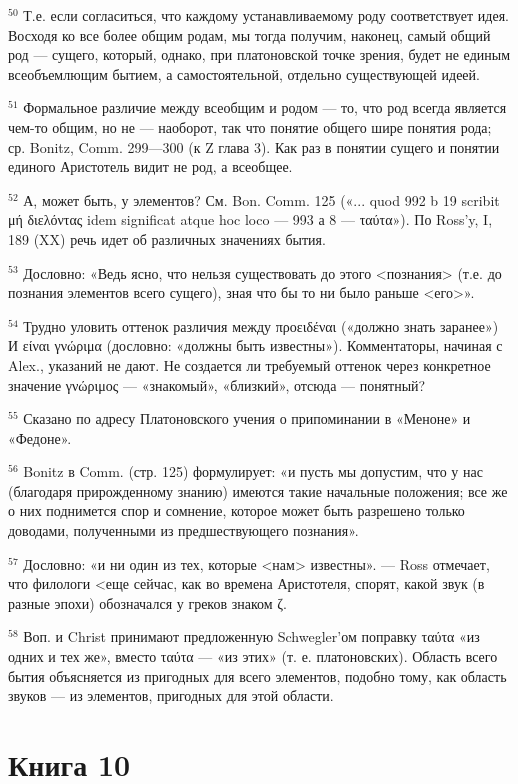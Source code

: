 \documentclass[oneside, 17pt, dvipsnames]{extbook}
\begin{document}
$^{50}$ Т.е. если согласиться, что каждому устанавливаемому роду соответствует идея. Восходя ко все более общим родам, мы тогда получим, наконец, самый общий род — сущего, который, однако, при платоновской точке зрения, будет не единым всеобъемлющим бытием, а самостоятельной, отдельно существующей идеей.

$^{51}$ Формальное различие между всеобщим и родом — то, что род всегда является чем-то общим, но не — наоборот, так что понятие общего шире понятия рода; ср. Bonitz, Comm. 299—300 (к Ζ глава 3). Как раз в понятии сущего и понятии единого Аристотель видит не род, а всеобщее.

$^{52}$ А, может быть, у элементов? См. Bon. Comm. 125 («... quod 992 b 19 scribit μή διελόντας idem significat atque hoc loco — 993 а 8 — ταύτα»). По Ross'y, I, 189 (XX) речь идет об различных значениях бытия.

$^{53}$ Дословно: «Ведь ясно, что нельзя существовать до этого <познания> (т.е. до познания элементов всего сущего), зная что бы то ни было раньше <его>».

$^{54}$ Трудно уловить оттенок различия между προειδέναι («должно знать заранее») И είναι γνώριμα (дословно: «должны быть известны»). Комментаторы, начиная с Alex., указаний не дают. Не создается ли требуемый оттенок через конкретное значение γνώριμος — «знакомый», «близкий», отсюда — понятный?

$^{55}$ Сказано по адресу Платоновского учения о припоминании в «Меноне» и «Федоне».

$^{56}$ Bonitz в Comm. (стр. 125) формулирует: «и пусть мы допустим, что у нас (благодаря прирожденному знанию) имеются такие начальные положения; все же о них поднимется спор и сомнение, которое может быть разрешено только доводами, полученными из предшествующего познания».

$^{57}$ Дословно: «и ни один из тех, которые <нам> известны». — Ross отмечает, что филологи <еще сейчас, как во времена Аристотеля, спорят, какой звук (в разные эпохи) обозначался у греков знаком ζ.

$^{58}$ Воп. и Christ принимают предложенную Schwegler'ом поправку ταύτα «из одних и тех же», вместо ταύτα — «из этих» (т. е. платоновских). Область всего бытия объясняется из пригодных для всего элементов, подобно тому, как область звуков — из элементов, пригодных для этой области.






\newpage
\section{Книга 10}
\end{document}
